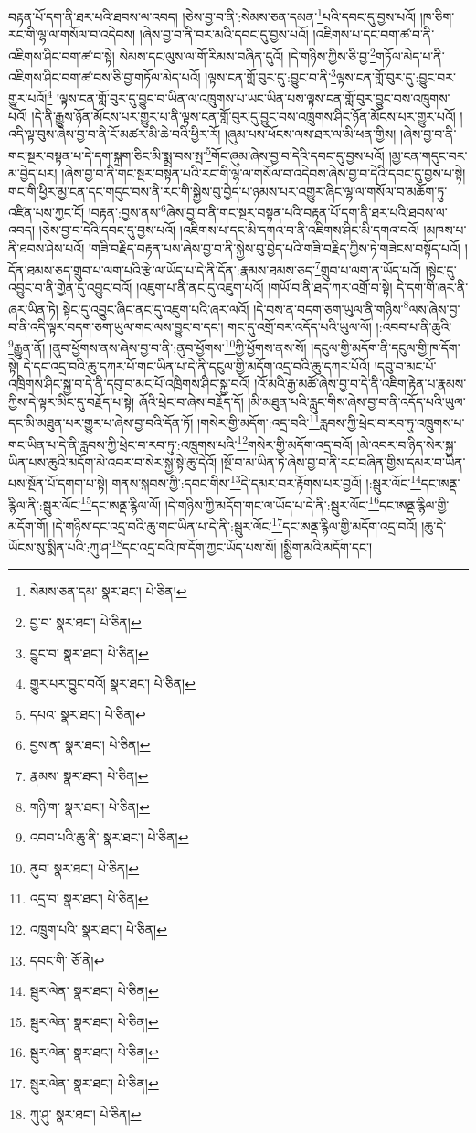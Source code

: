 བརྟན་པོ་དག་ནི་ཐར་པའི་ཐབས་ལ་འབད། །ཅེས་བྱ་བ་ནི་:སེམས་ཅན་དམན་\footnote{སེམས་ཅན་དམ་  སྣར་ཐང་།  པེ་ཅིན། }པའི་དབང་དུ་བྱས་པའོ། །ཁ་ཅིག་རང་གི་ལྷ་ལ་གསོལ་བ་འདེབས། །ཞེས་བྱ་བ་ནི་བར་མའི་དབང་དུ་བྱས་པའོ། །འཇིགས་པ་དང་བག་ཚ་བ་ནི་འཇིགས་ཤིང་བག་ཚ་བ་སྟེ། སེམས་དང་ལུས་ལ་གོ་རིམས་བཞིན་དུའོ། །དེ་གཉིས་ཀྱིས་ཅི་བྱ་\footnote{བྱ་བ་  སྣར་ཐང་།  པེ་ཅིན། }གཏོལ་མེད་པ་ནི་འཇིགས་ཤིང་བག་ཚ་བས་ཅི་བྱ་གཏོལ་མེད་པའོ། །ལྟས་ངན་གློ་བུར་དུ་:བྱུང་བ་ནི་\footnote{བྱུང་བ་  སྣར་ཐང་།  པེ་ཅིན། }ལྟས་ངན་གློ་བུར་དུ་:བྱུང་བར་གྱུར་པའོ།\footnote{གྱུར་པར་བྱུང་བའོ།  སྣར་ཐང་།  པེ་ཅིན། } །ལྟས་ངན་གློ་བུར་དུ་བྱུང་བ་ཡིན་ལ་འཁྲུགས་པ་ཡང་ཡིན་པས་ལྟས་ངན་གློ་བུར་བྱུང་བས་འཁྲུགས་པའོ། །དེ་ནི་རྒྱུས་ཉོན་མོངས་པར་གྱུར་པ་ནི་ལྟས་ངན་གློ་བུར་དུ་བྱུང་བས་འཁྲུགས་ཤིང་ཉོན་མོངས་པར་གྱུར་པའོ། །འདི་ལྟ་བུས་ཞེས་བྱ་བ་ནི་ངོ་མཚར་མི་ཆེ་བའི་ཕྱིར་རོ། །ཞུམ་པས་ཕོངས་ལས་ཐར་ལ་མི་ཕན་གྱིས། །ཞེས་བྱ་བ་ནི་གང་སྔར་བསྟན་པ་དེ་དག་སྐྲག་ཅིང་མི་སྨྲ་བས་སྤ་\footnote{དཔའ་  སྣར་ཐང་།  པེ་ཅིན། }གོང་ཞུམ་ཞེས་བྱ་བ་དེའི་དབང་དུ་བྱས་པའོ། །མྱ་ངན་གདུང་བར་མ་བྱེད་པར། །ཞེས་བྱ་བ་ནི་གང་སྔར་བསྟན་པའི་རང་གི་ལྷ་ལ་གསོལ་བ་འདེབས་ཞེས་བྱ་བ་དེའི་དབང་དུ་བྱས་པ་སྟེ། གང་གི་ཕྱིར་མྱ་ངན་དང་གདུང་བས་ནི་རང་གི་སྐྱེས་བུ་བྱེད་པ་ཉམས་པར་འགྱུར་ཞིང་ལྷ་ལ་གསོལ་བ་མཆོག་ཏུ་འཛིན་པས་ཀྱང་ངོ། །བརྟན་:བྱས་ནས་\footnote{བྱས་ན་  སྣར་ཐང་།  པེ་ཅིན། }ཞེས་བྱ་བ་ནི་གང་སྔར་བསྟན་པའི་བརྟན་པོ་དག་ནི་ཐར་པའི་ཐབས་ལ་འབད། །ཅེས་བྱ་བ་དེའི་དབང་དུ་བྱས་པའོ། །འཇིགས་པ་དང་མི་དགའ་བ་ནི་འཇིགས་ཤིང་མི་དགའ་བའོ། །མཁས་པ་ནི་ཐབས་ཤེས་པའོ། །གཟི་བརྗིད་བརྟན་པས་ཞེས་བྱ་བ་ནི་སྐྱེས་བུ་བྱེད་པའི་གཟི་བརྗིད་ཀྱིས་ཏེ་གཟེངས་བསྟོད་པའོ། །དོན་ཐམས་ཅད་གྲུབ་པ་ལག་པའི་རྩེ་ལ་ཡོད་པ་དེ་ནི་དོན་:རྣམས་ཐམས་ཅད་\footnote{རྣམས་  སྣར་ཐང་།  པེ་ཅིན། }གྲུབ་པ་ལག་ན་ཡོད་པའོ། །སྟེང་དུ་འབྱུང་བ་ནི་གྱེན་དུ་འབྱུང་བའོ། །འཇུག་པ་ནི་ནང་དུ་འཇུག་པའོ། །གཡོ་བ་ནི་ཐད་ཀར་འགྲོ་བ་སྟེ། དེ་དག་གི་ཞར་ནི་ཞར་ཡིན་ཏེ། སྟེང་དུ་འབྱུང་ཞིང་ནང་དུ་འཇུག་པའི་ཞར་ལའོ། །དེ་བས་ན་བདག་ཅག་ཡུལ་ནི་གཉིས་\footnote{གཉི་ག་  སྣར་ཐང་།  པེ་ཅིན། }ལས་ཞེས་བྱ་བ་ནི་འདི་ལྟར་བདག་ཅག་ཡུལ་གང་ལས་བྱུང་བ་དང་། གང་དུ་འགྲོ་བར་འདོད་པའི་ཡུལ་ལོ། །:འབབ་པ་ནི་ཆུའི་\footnote{འབབ་པའི་ཆུ་ནི་  སྣར་ཐང་།  པེ་ཅིན། }རྒྱུན་ནོ། །ནུབ་ཕྱོགས་ནས་ཞེས་བྱ་བ་ནི་:ནུབ་ཕྱོགས་\footnote{ནུབ་  སྣར་ཐང་།  པེ་ཅིན། }ཀྱི་ཕྱོགས་ནས་སོ། །དངུལ་གྱི་མདོག་ནི་དངུལ་གྱི་ཁ་དོག་སྟེ། དེ་དང་འདྲ་བའི་ཆུ་དཀར་པོ་གང་ཡིན་པ་དེ་ནི་དངུལ་གྱི་མདོག་འདྲ་བའི་ཆུ་དཀར་པོའོ། །དབུ་བ་མང་པོ་འཁྲིགས་ཤིང་སྐྱ་བ་དེ་ནི་དབུ་བ་མང་པོ་འཁྲིགས་ཤིང་སྐྱ་བའོ། །འོ་མའི་རྒྱ་མཚོ་ཞེས་བྱ་བ་དེ་ནི་འཇིག་རྟེན་པ་རྣམས་ཀྱིས་དེ་ལྟར་མིང་དུ་བརྗོད་པ་སྟེ། ཞོའི་ཕྲེང་བ་ཞེས་བརྗོད་དོ། །མི་མཐུན་པའི་རླུང་གིས་ཞེས་བྱ་བ་ནི་འདོད་པའི་ཡུལ་དང་མི་མཐུན་པར་གྱུར་པ་ཞེས་བྱ་བའི་དོན་ཏོ། །གསེར་གྱི་མདོག་:འདྲ་བའི་\footnote{འདྲ་བ་  སྣར་ཐང་།  པེ་ཅིན། }རླབས་ཀྱི་ཕྲེང་བ་རབ་ཏུ་འཁྲུགས་པ་གང་ཡིན་པ་དེ་ནི་རླབས་ཀྱི་ཕྲེང་བ་རབ་ཏུ་:འཁྲུགས་པའི་\footnote{འཁྲུག་པའི་  སྣར་ཐང་།  པེ་ཅིན། }གསེར་གྱི་མདོག་འདྲ་བའོ། །མེ་འབར་བ་ཉིད་སེར་སྐྱ་ཡིན་པས་ཆུའི་མདོག་མེ་འབར་བ་སེར་སྐྱ་སྟེ་ཆུ་དེའོ། །སྔོ་བ་མ་ཡིན་ཏེ་ཞེས་བྱ་བ་ནི་རང་བཞིན་གྱིས་དམར་བ་ཡིན་པས་སྔོན་པོ་དགག་པ་སྟེ། གནས་སྐབས་ཀྱི་:དབང་གིས་\footnote{དབང་གི་  ཅོ་ནེ། }དེ་དམར་བར་རྟོགས་པར་བྱའོ། །:སྦུར་ལོང་\footnote{སྦུར་ལེན་  སྣར་ཐང་།  པེ་ཅིན། }དང་ཨནྡ་རྙིལ་ནི་:སྦུར་ལོང་\footnote{སྦུར་ལེན་  སྣར་ཐང་།  པེ་ཅིན། }དང་ཨནྡ་རྙིལ་ལོ། །དེ་གཉིས་ཀྱི་མདོག་གང་ལ་ཡོད་པ་དེ་ནི་:སྦུར་ལོང་\footnote{སྦུར་ལེན་  སྣར་ཐང་།  པེ་ཅིན། }དང་ཨནྡ་རྙིལ་གྱི་མདོག་གོ། །དེ་གཉིས་དང་འདྲ་བའི་ཆུ་གང་ཡིན་པ་དེ་ནི་:སྦུར་ལོང་\footnote{སྦུར་ལེན་  སྣར་ཐང་།  པེ་ཅིན། }དང་ཨནྡ་རྙིལ་གྱི་མདོག་འདྲ་བའོ། །ཆུ་དེ་ཡོངས་སུ་སྨིན་པའི་:ཀུ་ཤ་\footnote{ཀུ་ཤུ་  སྣར་ཐང་།  པེ་ཅིན། }དང་འདྲ་བའི་ཁ་དོག་ཀྱང་ཡོད་པས་སོ། །སྨྱིག་མའི་མདོག་དང་། 